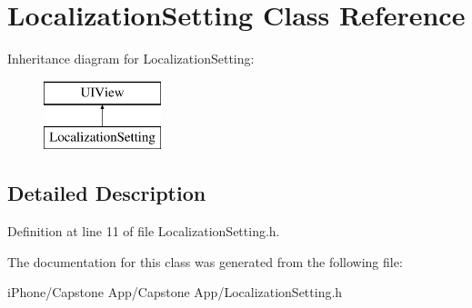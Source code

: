 \hypertarget{interface_localization_setting}{\section{Localization\-Setting Class Reference}
\label{interface_localization_setting}
}
Inheritance diagram for Localization\-Setting\-:\begin{figure}[H]
\begin{center}
\leavevmode
\includegraphics[height=2.000000cm]{interface_localization_setting}
\end{center}
\end{figure}


\subsection{Detailed Description}


Definition at line 11 of file Localization\-Setting.\-h.



The documentation for this class was generated from the following file\-:\begin{DoxyCompactItemize}
\item 
i\-Phone/\-Capstone App/\-Capstone App/Localization\-Setting.\-h\end{DoxyCompactItemize}
